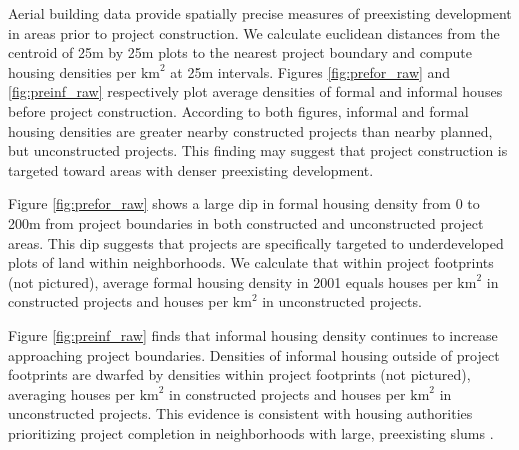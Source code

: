 \documentclass[12pt]{article}
\begin{document}
% 


Aerial building data provide spatially precise measures of preexisting development in areas prior to project construction.  We calculate euclidean distances from the centroid of 25m by 25m plots to the nearest project boundary and compute housing densities per $\text{km}^{2}$ at 25m intervals.  Figures \ref{fig:prefor_raw} and \ref{fig:preinf_raw} respectively plot average densities of formal and informal houses before project construction.  According to both figures, informal and formal housing densities are greater nearby constructed projects than nearby planned, but unconstructed projects.  This finding may suggest that project construction is targeted toward areas with denser preexisting development.  

Figure \ref{fig:prefor_raw} shows a large dip in formal housing density from 0 to 200m from project boundaries in both constructed and unconstructed project areas.  This dip suggests that projects are specifically targeted to underdeveloped plots of land within neighborhoods.  We calculate that within project footprints (not pictured), average formal housing density in 2001 equals houses per $\text{km}^{2}$ in constructed projects and houses per $\text{km}^{2}$ in unconstructed projects.  

Figure \ref{fig:preinf_raw} finds that informal housing density continues to increase approaching project boundaries.  Densities of informal housing outside of project footprints are dwarfed by densities within project footprints (not pictured), averaging houses per $\text{km}^{2}$ in constructed projects and houses per $\text{km}^{2}$ in unconstructed projects.  This evidence is consistent with housing authorities prioritizing project completion in neighborhoods with large, preexisting slums \citep{hofmeyr2008risk}.
\end{document}

